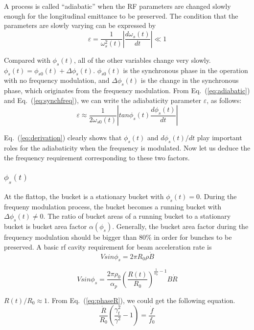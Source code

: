 A process is called “adiabatic” when the RF parameters are changed slowly enough for the longitudinal emittance to be preserved. The condition that the parameters are slowly varying can be expressed by
\begin{equation}
\varepsilon=\frac{1}{\omega_s^2(t)}|\frac{d\omega_s(t)}{dt}| \ll 1
\label{eq:adiabaticity}
\end{equation} 

Compared with $\phi_s(t)$, all of the other variables change very slowly. $\phi_s(t)=\phi_{s0}(t)+\Delta\phi_s(t)$. $\phi_{s0}(t)$ is the synchronous phase in the operation with no frequency modulation, and $\Delta \phi_s(t)$ is the change in the synchronous phase, which originates from the frequency modulation. From Eq.~(\ref{eq:adiabatic}) and Eq.~(\ref{eq:synchfreq}), we can write the adiabaticity parameter $\varepsilon$, as follows:
\begin{equation}
\varepsilon \approx \frac{1}{2\omega_{s0}(t)}|tan\phi_{s}(t)\frac{d\phi_s(t)}{dt}|
\label{eq:derivation}
\end{equation} 

Eq.~(\ref{eq:derivation}) clearly shows that $\phi_s(t)$ and $d\phi_s(t)/dt$ play important roles for the adiabaticity when the frequency is modulated. Now let us deduce the the frequency requirement corresponding to these two factors. 

\subsubsection{$\phi_s(t)$}
At the flattop, the bucket is a stationary bucket with $\phi_s(t)=0$. During the frequeny modulation process, the bucket becomes a running bucket with $\Delta\phi_s(t)\ne0$. The ratio of bucket areas of a running bucket to a stationary bucket is bucket area factor $\alpha(\phi_s)$. Generally, the bucket area factor during the frequency modulation should be bigger than 80\% in order for bunches to be preserved.
A basic rf cavity requirement for beam acceleration rate is
\begin{equation}
Vsin\phi_s=2\pi R_0\rho\dot{B} 
\label{eq:bucktsizeB}
\end{equation} 

\begin{equation}
Vsin\phi_s=\frac{2\pi \rho _0}{\alpha_p}(\frac{R(t)}{R_0})^{\frac{1}{\alpha_p}-1}B\dot R 
\label{eq:bucketsizeR}
\end{equation}

$R(t)/ R_0\approx 1$. From Eq.~(\ref{eq:phaseR}), we could get the following equation.
\begin{equation}
\frac{\dot R}{R_0}(\frac{\gamma_t^2}{\gamma^2}-1)=\frac{\dot f}{f_0} 
\label{eq:RtoF}
\end{equation}

